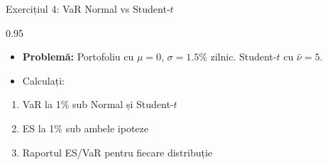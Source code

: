 \documentclass[9pt, aspectratio=169, t]{beamer}
\begin{document}
\begin{frame}{Exercițiul 4: VaR Normal vs Student-$t$}
\begin{cminipage}{0.95\textwidth}
    \begin{itemize}\setlength{\itemsep}{0pt}
        \item \textbf{Problemă:} Portofoliu cu $\mu = 0$, $\sigma = 1.5\%$ zilnic. Student-$t$ cu $\hat{\nu} = 5$.
        \item Calculați:
    \end{itemize}
    \begin{enumerate}\setlength{\itemsep}{0pt}
        \item VaR la 1\% sub Normal și Student-$t$
        \item ES la 1\% sub ambele ipoteze
        \item Raportul ES/VaR pentru fiecare distribuție
    \end{enumerate}
\end{cminipage}
\end{frame}
\end{document}
